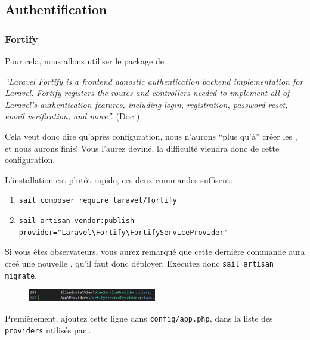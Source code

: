 \subsection[Authentification]{Authentification}\label{sec:auth}

\subsubsection[Fortify][laravel.com/docs/10.x/fortify]{Fortify}

Pour cela, nous allons utiliser le package \fortify{} de \laravel{}. 

\textit{``Laravel Fortify is a frontend agnostic authentication backend implementation for Laravel. Fortify registers the routes and controllers needed to implement all of Laravel's authentication features, including login, registration, password reset, email verification, and more''.} (\href{https://laravel.com/docs/10.x/fortify#what-is-fortify}{Doc \laravel})

Cela veut donc dire qu'après configuration, nous n'aurons ``plus qu'à'' créer les \views, et nous aurons finis! Vous l'aurez deviné, la difficulté viendra donc de cette configuration.

L'installation est plutôt rapide, ces deux commandes suffisent:
\begin{enumerate}
    \item \verb|sail composer require laravel/fortify|
    \item \verb|sail artisan vendor:publish --provider="Laravel\Fortify\FortifyServiceProvider"|
\end{enumerate}

Si vous êtes observateurs, vous aurez remarqué que cette dernière commande aura créé une nouvelle \migration{}, qu'il faut donc déployer. Exécutez donc \verb|sail artisan migrate|.



\begin{figure}
    \vspace{-0.5cm}
    \includegraphics[width=0.5\textwidth]{figures-C1/config_app.pdf}
\end{figure}
Premièrement, ajoutez cette ligne dans \linebreak \verb|config/app.php|, dans la liste des \verb|providers| utilisés par \laravel{}.

